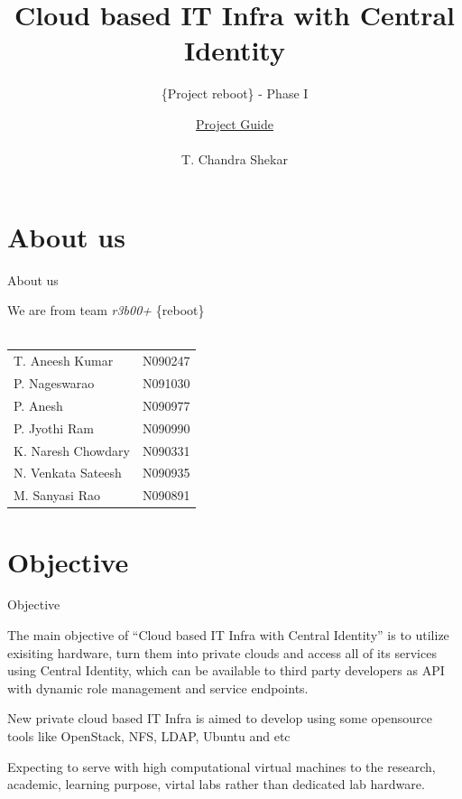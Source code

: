 \documentclass[xcolor=dvipsnames]{beamer}
\title[Cloud based IT Infra with Central Identity]{Cloud based IT Infra with Central Identity}
\subtitle{\{Project reboot\} - Phase I  }
\author{ \underline{Project Guide} \\ \hspace{2mm} \\ \small{ T. Chandra Shekar }  }
\institute{ \underline{Presenting by} \\ \hspace{2mm} \\ \textit {Team r3b00+ }  \\ \hspace{4mm} \\ \textit{Dept. of CSE, RGUKT - Nuzvid}}
\begin{document}
\begin{frame}
\titlepage
\end{frame}

\section{About us}
\begin{frame}{About us}

\small
\begin{center}
We are from team \textit{r3b00+}  \{reboot\} \\ \hspace{4cm} \\
\begin{tabular}{l  l }
T. Aneesh Kumar & N090247   \\
P. Nageswarao  & N091030  \\
P. Anesh  & N090977 \\
P. Jyothi Ram & N090990 \\
K. Naresh Chowdary  & N090331 \\
N. Venkata Sateesh  & N090935 \\
M. Sanyasi Rao & N090891  
\end{tabular}


\end{center}


\end{frame}
 
\setcounter{page}{1}
\section{Objective}
\begin{frame}{Objective}

The main objective of ``Cloud based IT Infra with Central Identity'' is to utilize exisiting hardware, turn them into private clouds and access all of its services using 
Central Identity, which can be available to third party developers as API with dynamic role management and service endpoints. \newline

New private cloud based IT Infra is aimed to develop using some opensource tools like OpenStack, NFS, LDAP, Ubuntu and etc \newline

Expecting to serve with high computational virtual machines to the research, academic, learning purpose, virtal labs rather than dedicated lab hardware.
\end{frame}
\end{document}
